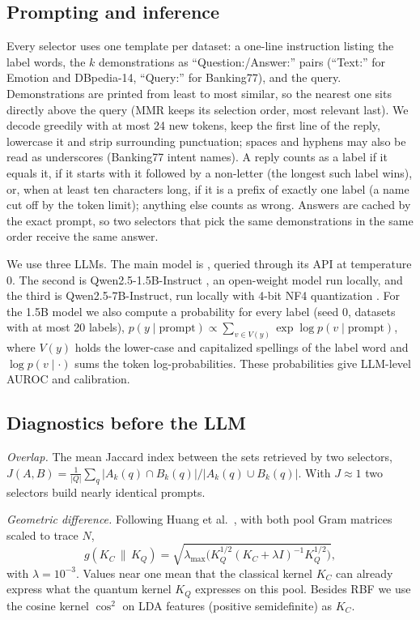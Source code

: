 \subsection{Prompting and inference}
Every selector uses one template per dataset: a one-line instruction listing the label words, the $k$
demonstrations as ``Question:/Answer:'' pairs (``Text:'' for Emotion and DBpedia-14, ``Query:'' for
Banking77), and the query.
Demonstrations are printed from least to most similar, so the nearest one sits directly above the query
(MMR keeps its selection order, most relevant last). We decode greedily with at most 24 new tokens,
keep the first line of the reply, lowercase it and strip surrounding punctuation; spaces and hyphens may
also be read as underscores (Banking77 intent names). A reply counts as a label if it equals it, if it
starts with it followed by a non-letter (the longest such label wins), or, when at least ten characters
long, if it is a prefix of exactly one label (a name cut off by the token limit); anything else counts as
wrong. Answers are cached by the exact prompt, so two selectors that pick
the same demonstrations in the same order receive the same answer.

We use three LLMs. The main model is \TModelName{}, queried through its API at temperature 0. The second
is Qwen2.5-1.5B-Instruct \cite{qwen2025qwen25}, an open-weight model run locally, and the third is
Qwen2.5-7B-Instruct, run locally with 4-bit NF4 quantization \cite{dettmers2023qlora}. For the 1.5B model we also
compute a probability for every label (seed 0, datasets with at most 20 labels),
$p(y\mid\text{prompt})\propto\sum_{v\in V(y)}\exp\log p(v\mid\text{prompt})$, where $V(y)$ holds the
lower-case and capitalized spellings of the label word and $\log p(v\mid\cdot)$ sums the token
log-probabilities. These probabilities give LLM-level AUROC and calibration.

\subsection{Diagnostics before the LLM}
\label{sec:diag}
\emph{Overlap.} The mean Jaccard index between the sets retrieved by two selectors,
$J(A,B)=\frac{1}{|Q|}\sum_{q}|A_k(q)\cap B_k(q)|/|A_k(q)\cup B_k(q)|$.
With $J\approx1$ two selectors build nearly identical prompts.

\emph{Geometric difference.} Following Huang et al.~\cite{huang2021power}, with both pool Gram
matrices scaled to trace $N$,
\begin{equation}
g(K_C\,\|\,K_Q)=\sqrt{\lambda_{\max}\!\bigl(K_Q^{1/2}(K_C+\lambda I)^{-1}K_Q^{1/2}\bigr)},
\label{eq:g}
\end{equation}
with $\lambda=10^{-3}$. Values near one mean that the classical kernel $K_C$ can already express what
the quantum kernel $K_Q$ expresses on this pool. Besides RBF we use the cosine kernel
$\cos^2$ on LDA features (positive semidefinite) as $K_C$.

